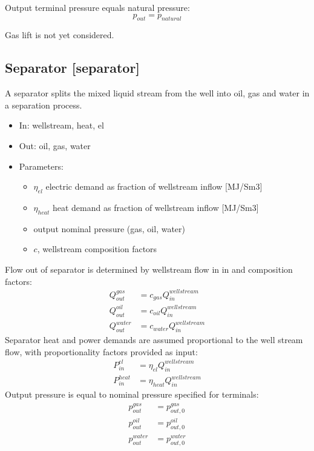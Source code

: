 \documentclass[12pt]{article}
\begin{document}
\medskip\noindent
Output terminal pressure equals natural pressure:
 \begin{equation}
 	p_{out}=p_{natural} 
 \end{equation}

Gas lift is not yet considered.





\subsection{Separator [separator]}

A separator splits the mixed liquid stream from the well into oil, gas and water in a separation process. 

\begin{itemize}
\item In: wellstream, heat, el
\item Out: oil, gas, water
\item Parameters:
\begin{itemize}[noitemsep,topsep=0pt]
	\item $ \eta _{el}$ electric demand as fraction of wellstream inflow [MJ/Sm3]
	\item $ \eta _{heat}$ heat demand as fraction of wellstream inflow [MJ/Sm3]
	\item output nominal pressure (gas, oil, water)
	\item $c$, wellstream composition factors
\end{itemize}
\end{itemize}



Flow out of separator is determined by wellstream flow in in and composition factors:
 \begin{align}
 Q_{out}^{gas} &=c_{gas}Q_{in}^{wellstream} \\
 Q_{out}^{oil} &=c_{oil}Q_{in}^{wellstream} \\
 Q_{out}^{water} &=c_{water}Q_{in}^{wellstream} 
 \end{align}
Separator heat and power demands are assumed proportional to the well stream flow, 
with proportionality factors provided as input:
\begin{align}
	P_{in}^{el} 		&= \eta _{el}Q_{in}^{wellstream}\\
	P_{in}^{heat}	&= \eta _{heat}Q_{in}^{wellstream}
\end{align}
%
Output pressure is equal to nominal pressure specified for terminals:
\begin{align}
 p_{out}^{gas}		&=p_{out,0}^{gas} \\
 p_{out}^{oil}		&=p_{out,0}^{oil} \\
 p_{out}^{water}	&=p_{out,0}^{water} 
 \end{align}
\end{document}

